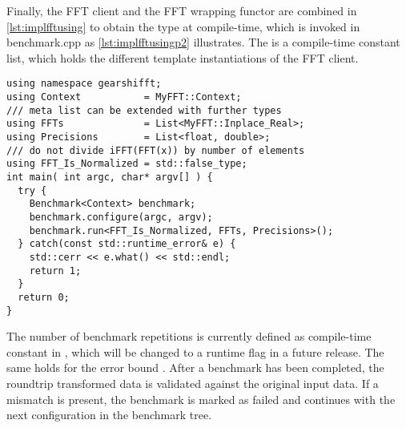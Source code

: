 Finally, the FFT client and the FFT wrapping functor are combined in \cref{lst:implfftusing} to obtain the type at compile-time, which is invoked in benchmark.cpp as \cref{lst:implfftusingp2} illustrates. The  is a compile-time constant list, which holds the different template instantiations of the FFT client. 

\begin{lstlisting}[caption={Using FFT client types to run the benchmarks},label={lst:implfftusingp2}]
using namespace gearshifft;
using Context           = MyFFT::Context;         
/// meta list can be extended with further types
using FFTs              = List<MyFFT::Inplace_Real>;
using Precisions        = List<float, double>;   
/// do not divide iFFT(FFT(x)) by number of elements
using FFT_Is_Normalized = std::false_type;
int main( int argc, char* argv[] ) {                                                        
  try {                                                  
    Benchmark<Context> benchmark;
    benchmark.configure(argc, argv);                     
    benchmark.run<FFT_Is_Normalized, FFTs, Precisions>();
  } catch(const std::runtime_error& e) {
    std::cerr << e.what() << std::endl;                  
    return 1;                                            
  }                                                      
  return 0;
}                                                        
\end{lstlisting}

The number of benchmark repetitions is currently defined as compile-time constant in , which will be changed to a runtime flag in a future release.
The same holds for the error bound . After a benchmark has been completed, the roundtrip transformed data is validated against the original input data. If a mismatch is present, the benchmark is marked as failed and \gearshifft{} continues with the next configuration in the benchmark tree.

